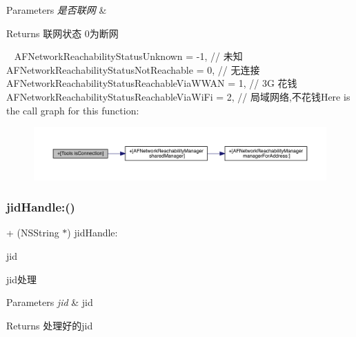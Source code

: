\begin{DoxyParams}{Parameters}
{\em 是否联网} & \\
\hline
\end{DoxyParams}
\begin{DoxyReturn}{Returns}
联网状态 0为断网 
\end{DoxyReturn}
~\newline
A\+F\+Network\+Reachability\+Status\+Unknown = -\/1, // 未知 A\+F\+Network\+Reachability\+Status\+Not\+Reachable = 0, // 无连接 A\+F\+Network\+Reachability\+Status\+Reachable\+Via\+W\+W\+AN = 1, // 3G 花钱 A\+F\+Network\+Reachability\+Status\+Reachable\+Via\+Wi\+Fi = 2, // 局域网络,不花钱Here is the call graph for this function\+:\nopagebreak
\begin{figure}[H]
\begin{center}
\leavevmode
\includegraphics[width=350pt]{interface_tools_a72688197a3180b11a3d2fcb4f0719838_cgraph}
\end{center}
\end{figure}
\mbox{\label{interface_tools_a7171f876560060564ffbeaa8ae0eadcf}} 
\subsubsection{\texorpdfstring{jid\+Handle\+:()}{jidHandle:()}}
{\footnotesize\ttfamily + (N\+S\+String $\ast$) jid\+Handle\+: \begin{DoxyParamCaption}\item[{(N\+S\+String$\ast$)}]{jid }\end{DoxyParamCaption}}

jid处理


\begin{DoxyParams}{Parameters}
{\em jid} & jid\\
\hline
\end{DoxyParams}
\begin{DoxyReturn}{Returns}
处理好的jid 
\end{DoxyReturn}
\mbox{\label{interface_tools_ab01abacd7bee2d39ab2c4c067d2a47f4}} 
